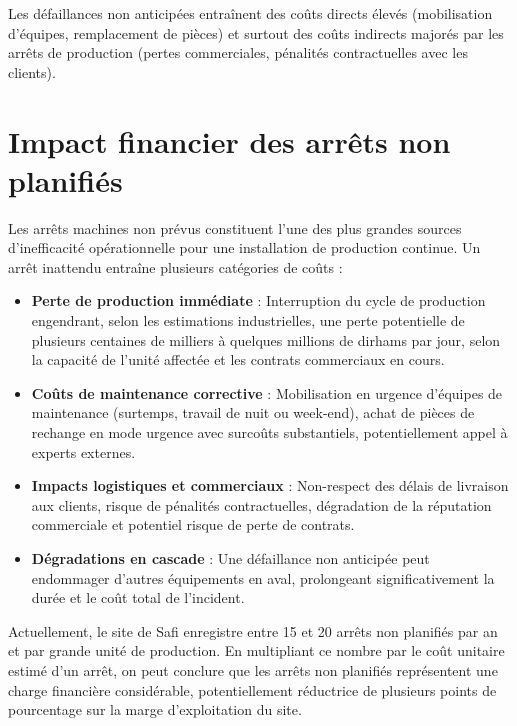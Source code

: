 \documentclass[a4paper,12pt,twoside]{report}
\begin{document}
Les défaillances non anticipées entraînent des coûts directs élevés (mobilisation d'équipes, remplacement de pièces) et surtout des coûts indirects majorés par les arrêts de production (pertes commerciales, pénalités contractuelles avec les clients).

\section{Impact financier des arrêts non planifiés}

Les arrêts machines non prévus constituent l'une des plus grandes sources d'inefficacité opérationnelle pour une installation de production continue. Un arrêt inattendu entraîne plusieurs catégories de coûts :

\begin{itemize}
    \item \textbf{Perte de production immédiate} : Interruption du cycle de production engendrant, selon les estimations industrielles, une perte potentielle de plusieurs centaines de milliers à quelques millions de dirhams par jour, selon la capacité de l'unité affectée et les contrats commerciaux en cours.
    
    \item \textbf{Coûts de maintenance corrective} : Mobilisation en urgence d'équipes de maintenance (surtemps, travail de nuit ou week-end), achat de pièces de rechange en mode urgence avec surcoûts substantiels, potentiellement appel à experts externes.
    
    \item \textbf{Impacts logistiques et commerciaux} : Non-respect des délais de livraison aux clients, risque de pénalités contractuelles, dégradation de la réputation commerciale et potentiel risque de perte de contrats.
    
    \item \textbf{Dégradations en cascade} : Une défaillance non anticipée peut endommager d'autres équipements en aval, prolongeant significativement la durée et le coût total de l'incident.
\end{itemize}

Actuellement, le site de Safi enregistre entre 15 et 20 arrêts non planifiés par an et par grande unité de production. En multipliant ce nombre par le coût unitaire estimé d'un arrêt, on peut conclure que les arrêts non planifiés représentent une charge financière considérable, potentiellement réductrice de plusieurs points de pourcentage sur la marge d'exploitation du site.
\end{document}
